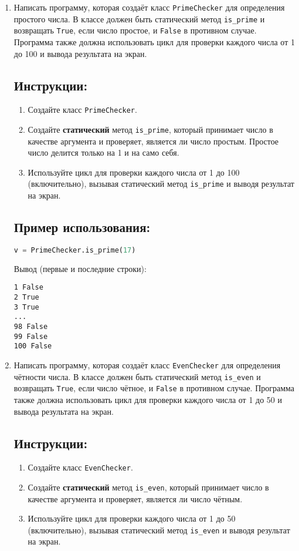 \begin{enumerate}
\item
Написать программу, которая создаёт класс \texttt{PrimeChecker} 
для определения простого числа. В классе должен быть статический метод
\texttt{is\_prime} и возвращать \texttt{True}, если число простое, 
и \texttt{False} в противном случае. 
Программа также должна использовать цикл для проверки каждого числа от 
1 до 100 и вывода результата на экран.

\subsection*{Инструкции:}
\begin{enumerate}
    \item Создайте класс \texttt{PrimeChecker}.
    \item Создайте \textbf{статический} метод \texttt{is\_prime}, который принимает число в качестве аргумента и проверяет, является ли число простым. Простое число делится только на 1 и на само себя.
    \item Используйте цикл для проверки каждого числа от 1 до 100 (включительно), вызывая статический метод \texttt{is\_prime} и выводя результат на экран.
\end{enumerate}

\subsection*{Пример использования:}
\begin{lstlisting}[language=Python]
    v = PrimeChecker.is_prime(17)
\end{lstlisting}
Вывод (первые и последние строки):
\begin{verbatim}
1 False
2 True
3 True
...
98 False
99 False
100 False
\end{verbatim}

\item
Написать программу, которая создаёт класс \texttt{EvenChecker} 
для определения чётности числа. В классе должен быть статический метод
\texttt{is\_even} и возвращать \texttt{True}, если число чётное, 
и \texttt{False} в противном случае. 
Программа также должна использовать цикл для проверки каждого числа от 
1 до 50 и вывода результата на экран.

\subsection*{Инструкции:}
\begin{enumerate}
    \item Создайте класс \texttt{EvenChecker}.
    \item Создайте \textbf{статический} метод \texttt{is\_even}, который принимает число в качестве аргумента и проверяет, является ли число чётным.
    \item Используйте цикл для проверки каждого числа от 1 до 50 (включительно), вызывая статический метод \texttt{is\_even} и выводя результат на экран.
\end{enumerate}


\end{enumerate}
